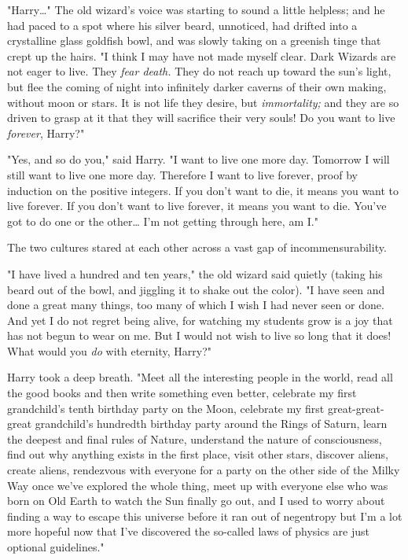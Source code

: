 "Harry{\ldots}" The old wizard's voice was starting to sound a little helpless;
and he had paced to a spot where his silver beard, unnoticed, had drifted into
a crystalline glass goldfish bowl, and was slowly taking on a greenish tinge
that crept up the hairs. "I think I may have not made myself clear. Dark
Wizards are not eager to live. They \emph{fear death.} They do not reach up
toward the sun's light, but flee the coming of night into infinitely darker
caverns of their own making, without moon or stars. It is not life they desire,
but \emph{immortality;} and they are so driven to grasp at it that they will
sacrifice their very souls! Do you want to live \emph{forever}, Harry?"

"Yes, and so do you," said Harry. "I want to live one more day. Tomorrow I will
still want to live one more day. Therefore I want to live forever, proof by
induction on the positive integers. If you don't want to die, it means you want
to live forever. If you don't want to live forever, it means you want to die.
You've got to do one or the other{\ldots} I'm not getting through here, am I."

The two cultures stared at each other across a vast gap of incommensurability.

"I have lived a hundred and ten years," the old wizard said quietly (taking his
beard out of the bowl, and jiggling it to shake out the color). "I have seen
and done a great many things, too many of which I wish I had never seen or
done. And yet I do not regret being alive, for watching my students grow is a
joy that has not begun to wear on me. But I would not wish to live so long that
it does! What would you \emph{do} with eternity, Harry?"

Harry took a deep breath. "Meet all the interesting people in the world, read
all the good books and then write something even better, celebrate my first
grandchild's tenth birthday party on the Moon, celebrate my first
great-great-great grandchild's hundredth birthday party around the Rings of
Saturn, learn the deepest and final rules of Nature, understand the nature of
consciousness, find out why anything exists in the first place, visit other
stars, discover aliens, create aliens, rendezvous with everyone for a party on
the other side of the Milky Way once we've explored the whole thing, meet up
with everyone else who was born on Old Earth to watch the Sun finally go out,
and I used to worry about finding a way to escape this universe before it ran
out of negentropy but I'm a lot more hopeful now that I've discovered the
so-called laws of physics are just optional guidelines."

